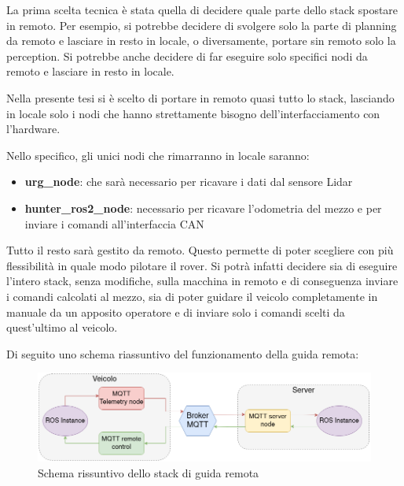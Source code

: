 \noindent La prima scelta tecnica è stata quella di decidere quale parte dello stack spostare in remoto. Per esempio, si potrebbe decidere di svolgere solo la parte di planning da remoto e lasciare in resto in locale, o diversamente, portare sin remoto solo la perception. Si potrebbe anche decidere di far eseguire solo specifici nodi da remoto e lasciare in resto in locale.

\noindent Nella presente tesi si è scelto di portare in remoto quasi tutto lo stack, lasciando in locale solo i nodi che hanno strettamente bisogno dell'interfacciamento con l'hardware.

\noindent Nello specifico, gli unici nodi che rimarranno in locale saranno:

\begin{itemize}
  \item \textbf{urg\_node}: che sarà necessario per ricavare i dati dal sensore Lidar
  \item \textbf{hunter\_ros2\_node}: necessario per ricavare l'odometria del mezzo e per inviare i comandi all'interfaccia CAN
\end{itemize}

\noindent Tutto il resto sarà gestito da remoto. Questo permette di poter scegliere con più flessibilità in quale modo pilotare il rover. Si potrà infatti decidere sia di eseguire l'intero stack, senza modifiche, sulla macchina in remoto e di conseguenza inviare i comandi calcolati al mezzo, sia di poter guidare il veicolo completamente in manuale da un apposito operatore e di inviare solo i comandi scelti da quest'ultimo al veicolo.

\noindent Di seguito uno schema riassuntivo del funzionamento della guida remota:

\begin{figure}[h]
  \centering
  \includegraphics[width=1\textwidth]{figures/schema_guida_remota.png}
  \caption{Schema rissuntivo dello stack di guida remota}
  \label{Schema rissuntivo dello stack di guida remota}
\end{figure}

